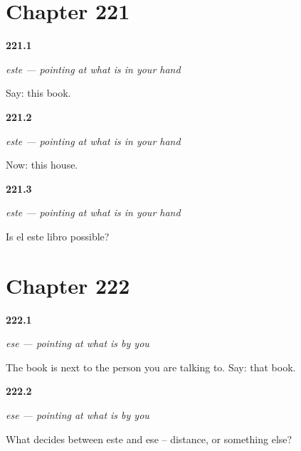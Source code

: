 \section*{Chapter 221}

\noindent\begin{minipage}[t]{\linewidth}
\raggedright
\hypertarget{review-ES-C59-este-say}{\textbf{221.1}} \emph{este — pointing at what is in your hand}\par
\small Say: this book.
\end{minipage}\par\medskip

\noindent\begin{minipage}[t]{\linewidth}
\raggedright
\hypertarget{review-ES-C59-este-agree}{\textbf{221.2}} \emph{este — pointing at what is in your hand}\par
\small Now: this house.
\end{minipage}\par\medskip

\noindent\begin{minipage}[t]{\linewidth}
\raggedright
\hypertarget{review-ES-C59-este-article}{\textbf{221.3}} \emph{este — pointing at what is in your hand}\par
\small Is el este libro possible?
\end{minipage}\par\medskip

\section*{Chapter 222}

\noindent\begin{minipage}[t]{\linewidth}
\raggedright
\hypertarget{review-ES-C59-ese-say}{\textbf{222.1}} \emph{ese — pointing at what is by you}\par
\small The book is next to the person you are talking to. Say: that book.
\end{minipage}\par\medskip

\noindent\begin{minipage}[t]{\linewidth}
\raggedright
\hypertarget{review-ES-C59-ese-contrast}{\textbf{222.2}} \emph{ese — pointing at what is by you}\par
\small What decides between este and ese -- distance, or something else?
\end{minipage}\par\medskip

